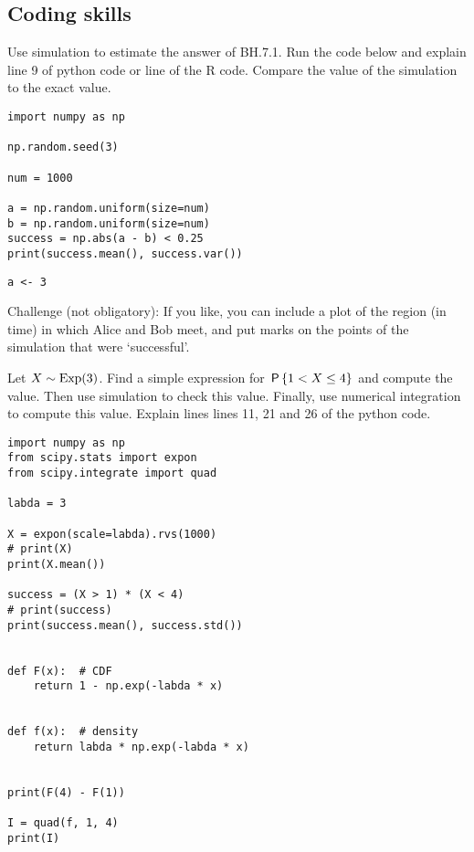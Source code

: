 \documentclass[assignments]{subfiles}
\begin{document}
\subsection{Coding skills}
\label{sec:coding-skills}



\begin{exercise} 
Use simulation to estimate the answer of BH.7.1. Run the code below and explain line 9 of python code or line of the R code.
Compare the value of the simulation to the exact value.

\begin{verbatim}
import numpy as np

np.random.seed(3)

num = 1000

a = np.random.uniform(size=num)
b = np.random.uniform(size=num)
success = np.abs(a - b) < 0.25
print(success.mean(), success.var())
\end{verbatim}


\begin{verbatim}
a <- 3
\end{verbatim}

Challenge (not obligatory): If you like, you can include a plot of the region (in time) in which Alice and Bob meet, and put marks on the points of the simulation that were `successful'. 
\end{exercise}



\begin{exercise}
Let $X\sim\Exp{3}$.
Find a simple expression for $\P{1 < X \leq 4}$ and compute the value.
Then use simulation to check this value.
Finally, use numerical integration to compute this value. Explain lines lines 11, 21 and 26 of the python code. 

\begin{verbatim}
import numpy as np
from scipy.stats import expon
from scipy.integrate import quad

labda = 3

X = expon(scale=labda).rvs(1000)
# print(X)
print(X.mean())

success = (X > 1) * (X < 4)
# print(success)
print(success.mean(), success.std())


def F(x):  # CDF
    return 1 - np.exp(-labda * x)


def f(x):  # density
    return labda * np.exp(-labda * x)


print(F(4) - F(1))

I = quad(f, 1, 4)
print(I)
\end{verbatim}
\end{exercise}
\end{document}
